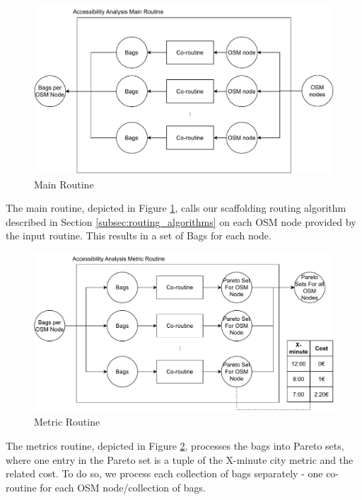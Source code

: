 

\begin{figure}
    \centering
    \includegraphics[scale=0.75]{Figures/method/main_routine}
    \caption{Main Routine}
    \label{fig:main_routine}
\end{figure}
The main routine, depicted in Figure \ref{fig:main_routine}, calls our scaffolding routing algorithm described in Section \ref{subsec:routing_algorithms} on each OSM node provided by the input routine.
This results in a set of Bags for each node.

\begin{figure}
    \centering
    \includegraphics[scale=0.75]{Figures/method/metric_routine}
    \caption{Metric Routine}
    \label{fig:metric_routine}
\end{figure}
The metrics routine, depicted in Figure \ref{fig:metric_routine}, processes the bags into Pareto sets, where one entry in the Pareto set is a tuple of the X-minute city metric and the related cost.
To do so, we process each collection of bags separately - one co-routine for each OSM node/collection of bags.

